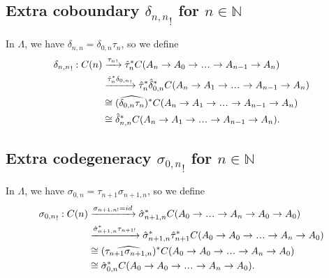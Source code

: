\subsection{Extra coboundary 
  ${\delta_{n,n}}_!$ for 
  $n \in \mathbb{N}$}
In $\Lambda$, we have $\delta_{n,n} = 
\delta_{0,n}\tau_n$, so we define 
\begin{align*}
{{\delta}_{n,n}}_! : C(n)
& \xrightarrow{{\tau_n}_!}
\hat{\tau}_n^*
  C(A_n \to A_0 \to \smdots \to A_{n-1} \to A_n)\\
& \xrightarrow{\hat{\tau}_n^*{\delta_{0,n}}_!}
\hat{\tau}_n^*\hat{\delta}_{0,n}^*
  C(A_n \to A_1 \to \smdots \to A_{n-1} \to A_n) \\
&\cong
(\widehat{\delta_{0,n}\tau_n})^*
  C(A_n \to A_1 \to \smdots \to A_{n-1} \to A_n)\\
&\cong
\hat{\delta}_{n,n}^*
C(A_n \to A_1 \to \smdots \to A_{n-1} \to A_n).
\end{align*}

\subsection{Extra codegeneracy 
  ${\sigma_{0,n}}_!$ for 
  $n \in \mathbb{N}$}
In $\Lambda$, we have $\sigma_{0,n} = 
\tau_{n+1} \sigma_{n+1,n}$, so we define 
\begin{align*}
{{\sigma}_{0,n}}_! : C(n)
& \xrightarrow{\sigma_{n+1,n!} = id}
\hat{\sigma}_{n+1,n}^*
  C(A_0 \to \smdots \to A_n \to A_0 \to A_0)\\
& \xrightarrow{\hat{\sigma}_{n+1,n}^*\tau_{n+1!}}
\hat{\sigma}_{n+1,n}^*\hat{\tau}_{n+1}^*
  C(A_0 \to A_0 \to \smdots \to A_n \to A_0) \\
&\cong
(\widehat{\tau_{n+1} \sigma_{n+1,n}})^*
  C(A_0 \to A_0 \to \smdots \to A_n \to A_0)\\
&\cong
\hat{\sigma}_{0,n}^*
C(A_0 \to A_0 \to \smdots \to A_n \to A_0).
\end{align*}
